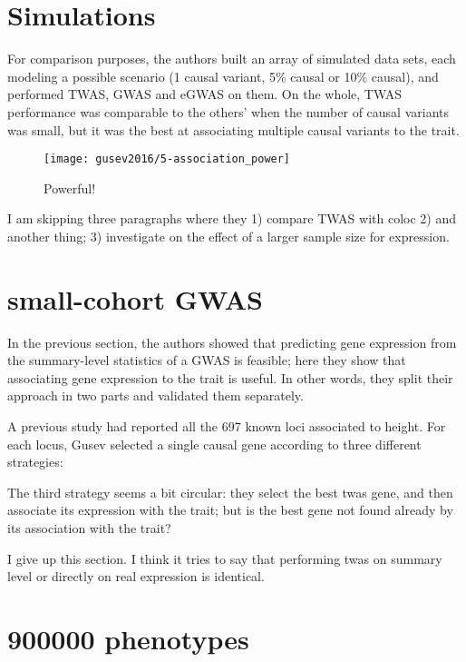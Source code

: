 \documentclass[../main.tex]{subfiles}
\begin{document}

\section{Simulations}

For comparison purposes, the authors built an array of simulated data 
sets, each modeling a possible scenario (1 causal variant, 5\% causal or 
10\% causal), and performed TWAS, GWAS and eGWAS on them. On the whole, 
TWAS performance was comparable to the others' when the number of causal 
variants was small, but it was the best at associating multiple causal 
variants to the trait.

\begin{figure}
	\texttt{[image: gusev2016/5-association\_power]}
	\caption{Powerful!}
\end{figure}

I am skipping three paragraphs where they 1) compare TWAS with coloc 
2) and another thing; 3) investigate on the effect of a larger sample 
   size for expression.

\section{small-cohort GWAS}

In the previous section, the authors showed that predicting gene 
expression from the summary-level statistics of a GWAS is feasible; here 
they show that associating gene expression to the trait is useful. In 
other words, they split their approach in two parts and validated them 
separately.

A previous study had reported all the 697 known loci associated to 
height. For each locus, Gusev \etal selected a single causal gene 
according to three different strategies:

The third strategy seems a bit circular: they select the best twas gene, 
and then associate its expression with the trait; but is the best gene 
not found already by its association with the trait?

I give up this section. I think it tries to say that performing twas on 
summary level or directly on real expression is identical.

\section{900000 phenotypes}
\end{document}
